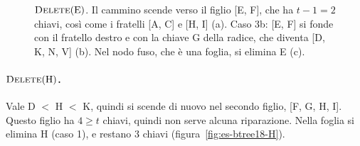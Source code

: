 \begin{figure}[htbp]
\caption{$\textsc{Delete}(\mathrm{E})$. Il cammino scende verso il figlio [E, F], che ha $t-1 = 2$ chiavi, così come i fratelli [A, C] e [H, I] (a). Caso 3b: [E, F] si fonde con il fratello destro e con la chiave G della radice, che diventa [D, K, N, V] (b). Nel nodo fuso, che è una foglia, si elimina E (c).}
\label{fig:es-btree18-E}
\end{figure}

\paragraph{$\textsc{Delete}(\mathrm{H})$.}
Vale D $<$ H $<$ K, quindi si scende di nuovo nel secondo figlio, [F, G, H, I]. Questo figlio ha $4 \ge t$ chiavi, quindi non serve alcuna riparazione. Nella foglia si elimina H (caso 1), e restano $3$ chiavi (figura~\ref{fig:es-btree18-H}).

